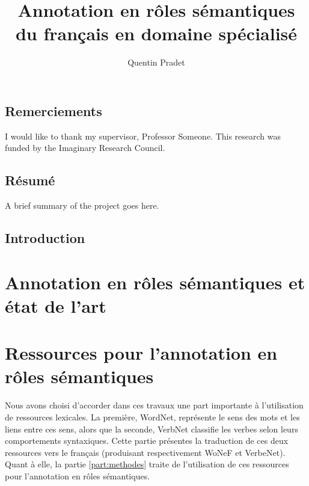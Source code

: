 \documentclass[oneside,parskip]{scrbook}
\title{Annotation en rôles sémantiques \\ du français en domaine spécialisé}
\author{Quentin Pradet}
\date{}
\begin{document}
\maketitle

\frontmatter
\tableofcontents
\listoffigures
\listoftables

\chapter{Remerciements}

I would like to thank my supervisor, Professor Someone. This
research was funded by the Imaginary Research Council.

\chapter{Résumé}

A brief summary of the project goes here.


\mainmatter

\chapter{Introduction}
\label{ch:intro}

\part{Annotation en rôles sémantiques et état de l'art}





\part{Ressources pour l'annotation en rôles sémantiques}


Nous avons choisi d'accorder dans ces travaux une part importante à
l'utilisation de ressources lexicales. La première, WordNet, représente le sens
des mots et les liens entre ces sens, alors que la seconde, VerbNet classifie
les verbes selon leurs comportements syntaxiques. Cette partie présentes la
traduction de ces deux ressources vers le français (produisant respectivement
WoNeF et VerbeNet). Quant à elle, la partie \ref{part:methodes} traite de
l'utilisation de ces ressources pour l'annotation en rôles sémantiques.
\end{document}
